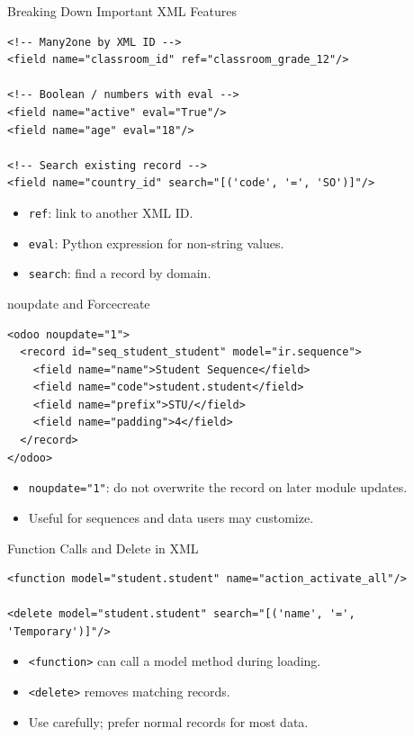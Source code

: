 \begin{frame}[fragile]{Breaking Down Important XML Features}
\begin{lstlisting}[style=xml]
<!-- Many2one by XML ID -->
<field name="classroom_id" ref="classroom_grade_12"/>

<!-- Boolean / numbers with eval -->
<field name="active" eval="True"/>
<field name="age" eval="18"/>

<!-- Search existing record -->
<field name="country_id" search="[('code', '=', 'SO')]"/>
\end{lstlisting}
	\begin{itemize}
		\item \texttt{ref}: link to another XML ID.
		\item \texttt{eval}: Python expression for non-string values.
		\item \texttt{search}: find a record by domain.
	\end{itemize}
\end{frame}

\begin{frame}[fragile]{noupdate and Forcecreate}
\begin{lstlisting}[style=xml]
<odoo noupdate="1">
  <record id="seq_student_student" model="ir.sequence">
	<field name="name">Student Sequence</field>
	<field name="code">student.student</field>
	<field name="prefix">STU/</field>
	<field name="padding">4</field>
  </record>
</odoo>
\end{lstlisting}
	\begin{itemize}
		\item \texttt{noupdate="1"}: do not overwrite the record on later module updates.
		\item Useful for sequences and data users may customize.
	\end{itemize}
\end{frame}

\begin{frame}[fragile]{Function Calls and Delete in XML}
\begin{lstlisting}[style=xml]
<function model="student.student" name="action_activate_all"/>

<delete model="student.student" search="[('name', '=', 'Temporary')]"/>
\end{lstlisting}
	\begin{itemize}
		\item \texttt{<function>} can call a model method during loading.
		\item \texttt{<delete>} removes matching records.
		\item Use carefully; prefer normal records for most data.
	\end{itemize}
\end{frame}

